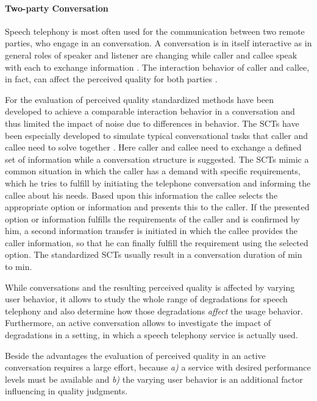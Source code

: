 \paragraph*{Two-party Conversation}
Speech telephony is most often used for the communication between two remote parties, who engage in an conversation.
A conversation is in itself interactive as in general roles of speaker and listener are changing while caller and callee speak with each to exchange information \citep[\eg,][]{hopper_telephone_2002}.
The interaction behavior of caller and callee, in fact, can affect the perceived quality for both parties \citep[\cf,][]{schoenenberg_why_2014}.

For the evaluation of perceived quality standardized methods have been developed to achieve a comparable interaction behavior in a conversation and thus limited the impact of noise due to differences in behavior.
The \acp{SCT} have been especially developed to simulate typical conversational tasks that caller and callee need to solve together \cite[\cf,][p. 76]{moller_assessment_2000}.
Here caller and callee need to exchange a defined set of information while a conversation structure is suggested.
The \acp{SCT} mimic a common situation in which the caller has a demand with specific requirements, which he tries to fulfill by initiating the telephone conversation and informing the callee about his needs.
Based upon this information the callee selects the appropriate option or information and presents this to the caller.
If the presented option or information fulfills the requirements of the caller and is confirmed by him, a second information transfer is initiated in which the callee provides the caller information, so that he can finally fulfill the requirement using the selected option.
The standardized \acp{SCT} \citep{itu-t_p.805:_2007} usually result in a conversation duration of \unit[3]{min} to \unit[7]{min}.

While conversations and the resulting perceived quality is affected by varying user behavior, it allows to study the whole range of degradations for speech telephony and also determine how those degradations \emph{affect} the usage behavior.
Furthermore, an active conversation allows to investigate the impact of degradations in a setting, in which a speech telephony service is actually used.

Beside the advantages the evaluation of perceived quality in an active conversation requires a large effort, because \emph{a)} a service with desired performance levels must be available and \emph{b)} the varying user behavior is an additional factor influencing in quality judgments.


